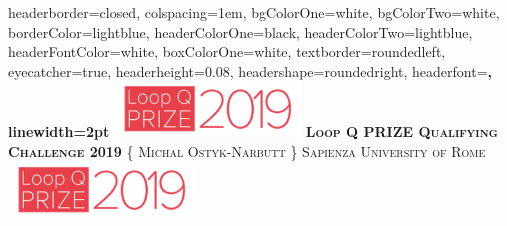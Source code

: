 \documentclass[landscape,a0paper,fontscale=0.285]{baposter} %
\begin{document}
\begin{poster}
{
headerborder=closed, %
colspacing=1em, %
bgColorOne=white, %
bgColorTwo=white, %
borderColor=lightblue, %
headerColorOne=black, %
headerColorTwo=lightblue, %
headerFontColor=white, %
boxColorOne=white, %
textborder=roundedleft, %
eyecatcher=true, %
headerheight=0.08\textheight, %
headershape=roundedright, %
headerfont=\Large\bf\textsc, %
linewidth=2pt %
}
%
{\includegraphics[height=4em]{loopq.png}}
{\bf\textsc{Loop Q PRIZE Qualifying Challenge 2019}\vspace{0.1em}} %
{\textsc{\{ Michal Ostyk-Narbutt \} \hspace{10pt} Sapienza University of Rome}} %
{\includegraphics[height=4em]{loopq.png}} %



\end{poster}
\end{document}
